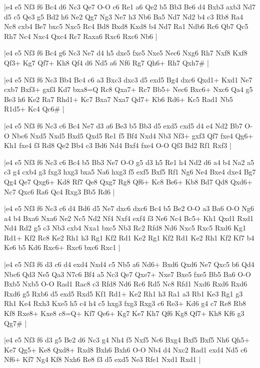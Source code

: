 \whitename{}
\blackname{}
\makegametitle
|e4 e5 Nf3 f6 Bc4 d6 Nc3 Qe7 O-O c6 Re1 a6 Qe2 b5 Bb3 Be6 d4 Bxb3 axb3 Nd7 d5 c5 Qe3 g5 Bd2 h6 Ne2 Qg7 Ng3 Ne7 h3 Nb6 Ba5 Nd7 Nd2 b4 c3 Rb8 Ra4 Nc8 cxb4 Be7 bxc5 Nxc5 Rc4 Bd8 Bxd8 Kxd8 b4 Nd7 Ra1 Ndb6 Rc6 Qb7 Qc5 Rh7 Nc4 Nxc4 Qxc4 Rc7 Raxa6 Rxc6 Rxc6 Nb6  |

\whitename{}
\blackname{}
\makegametitle
|e4 e5 Nf3 f6 Bc4 g6 Nc3 Ne7 d4 h5 dxe5 fxe5 Nxe5 Nec6 Nxg6 Rh7 Nxf8 Kxf8 Qf3+ Kg7 Qf7+ Kh8 Qf4 d6 Nd5 a6 Nf6 Rg7 Qh6+ Rh7 Qxh7\#  |

\whitename{}
\blackname{}
\makegametitle
|e4 e5 Nf3 f6 Nc3 Bb4 Bc4 c6 a3 Bxc3 dxc3 d5 exd5 Bg4 dxc6 Qxd1+ Kxd1 Ne7 cxb7 Bxf3+ gxf3 Kd7 bxa8=Q Rc8 Qxa7+ Rc7 Bb5+ Nec6 Bxc6+ Nxc6 Qa4 g5 Be3 h6 Ke2 Ra7 Rhd1+ Kc7 Bxa7 Nxa7 Qd7+ Kb6 Rd6+ Kc5 Rad1 Nb5 R1d5+ Kc4 Qc6\#  |

\whitename{}
\blackname{}
\makegametitle
|e4 e5 Nf3 f6 Nc3 c6 Bc4 Ne7 d3 a6 Be3 b5 Bb3 d5 exd5 cxd5 d4 e4 Nd2 Bb7 O-O Nbc6 Nxd5 Nxd5 Bxd5 Qxd5 Re1 f5 Bf4 Nxd4 Nb3 Nf3+ gxf3 Qf7 fxe4 Qg6+ Kh1 fxe4 f3 Rd8 Qe2 Bb4 c3 Bd6 Nd4 Bxf4 fxe4 O-O Qf3 Bd2 Rf1 Rxf3  |

\whitename{}
\blackname{}
\makegametitle
|e4 e5 Nf3 f6 Nc3 c6 Bc4 b5 Bb3 Ne7 O-O g5 d3 h5 Re1 h4 Nd2 d6 a4 b4 Na2 a5 c3 g4 cxb4 g3 fxg3 hxg3 bxa5 Na6 hxg3 f5 exf5 Bxf5 Rf1 Ng6 Ne4 Bxe4 dxe4 Bg7 Qg4 Qe7 Qxg6+ Kd8 Rf7 Qe8 Qxg7 Rg8 Qf6+ Kc8 Be6+ Kb8 Bd7 Qd8 Qxd6+ Nc7 Qxc6 Ra6 Qc4 Rxg3 Bb5 Rd6  |

\whitename{}
\blackname{}
\makegametitle
|e4 e5 Nf3 f6 Nc3 c6 d4 Bd6 d5 Ne7 dxc6 dxc6 Bc4 b5 Be2 O-O a3 Ba6 O-O Ng6 a4 b4 Bxa6 Nxa6 Ne2 Nc5 Nd2 Nf4 Nxf4 exf4 f3 Ne6 Nc4 Bc5+ Kh1 Qxd1 Rxd1 Nd4 Rd2 g5 c3 Nb3 cxb4 Nxa1 bxc5 Nb3 Rc2 Rfd8 Nd6 Nxc5 Rxc5 Rxd6 Kg1 Rd1+ Kf2 Rc8 Ke2 Rh1 h3 Rg1 Kf2 Rd1 Ke2 Rg1 Kf2 Rd1 Ke2 Rh1 Kf2 Kf7 b4 Ke6 b5 Kd6 Rxc6+ Rxc6 bxc6 Rxc1  |

\whitename{}
\blackname{}
\makegametitle
|e4 e5 Nf3 f6 d3 c6 d4 exd4 Nxd4 c5 Nb5 a6 Nd6+ Bxd6 Qxd6 Ne7 Qxc5 b6 Qd4 Nbc6 Qd3 Ne5 Qa3 N7c6 Bf4 a5 Nc3 Qe7 Qxe7+ Nxe7 Bxe5 fxe5 Bb5 Ba6 O-O Bxb5 Nxb5 O-O Rad1 Rac8 c3 Rfd8 Nd6 Rc6 Rd5 Nc8 Rfd1 Nxd6 Rxd6 Rxd6 Rxd6 g5 Rxb6 d5 exd5 Rxd5 Kf1 Rd1+ Ke2 Rh1 h3 Ra1 a3 Rb1 Ke3 Rg1 g3 Rh1 Ke4 Rxh3 Kxe5 h5 c4 h4 c5 hxg3 fxg3 Rxg3 c6 Re3+ Kd6 g4 c7 Re8 Rb8 Kf8 Rxe8+ Kxe8 c8=Q+ Kf7 Qe6+ Kg7 Ke7 Kh7 Qf6 Kg8 Qf7+ Kh8 Kf6 g3 Qg7\#  |

\whitename{}
\blackname{}
\makegametitle
|e4 e5 Nf3 f6 d3 g5 Be2 d6 Nc3 g4 Nh4 f5 Nxf5 Nc6 Bxg4 Bxf5 Bxf5 Nh6 Qh5+ Ke7 Qg5+ Ke8 Qxd8+ Rxd8 Bxh6 Bxh6 O-O Nb4 d4 Nxc2 Rad1 exd4 Nd5 c6 Nf6+ Kf7 Ng4 Kf8 Nxh6 Re8 f3 d5 exd5 Ne3 Rfe1 Nxd1 Rxd1  |

